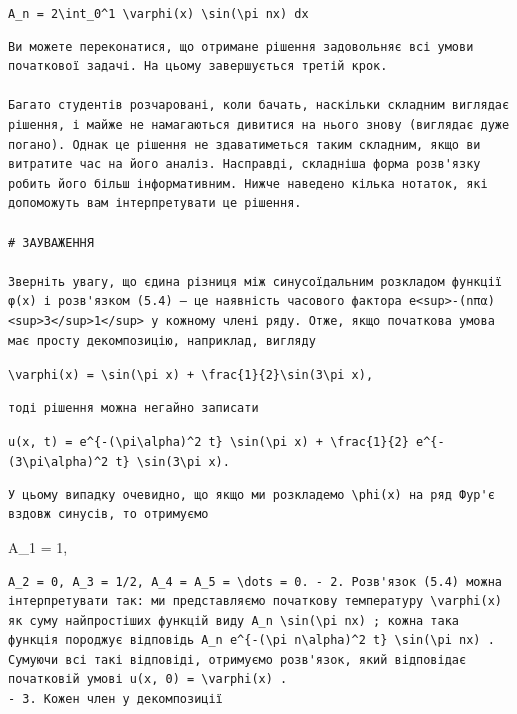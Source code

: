 \documentclass[
  ukrainian,
]{article}
\begin{document}
\texttt{A\_n\ =\ 2\textbackslash{}int\_0\^{}1\ \textbackslash{}varphi(x)\ \textbackslash{}sin(\textbackslash{}pi\ nx)\ dx}

\begin{verbatim}
Ви можете переконатися, що отримане рішення задовольняє всі умови початкової задачі. На цьому завершується третій крок.

Багато студентів розчаровані, коли бачать, наскільки складним виглядає рішення, і майже не намагаються дивитися на нього знову (виглядає дуже погано). Однак це рішення не здаватиметься таким складним, якщо ви витратите час на його аналіз. Насправді, складніша форма розв'язку робить його більш інформативним. Нижче наведено кілька нотаток, які допоможуть вам інтерпретувати це рішення.

# ЗАУВАЖЕННЯ

Зверніть увагу, що єдина різниця між синусоїдальним розкладом функції φ(x) і розв'язком (5.4) — це наявність часового фактора e<sup>-(nπα)<sup>3</sup>1</sup> у кожному члені ряду. Отже, якщо початкова умова має просту декомпозицію, наприклад, вигляду
\end{verbatim}

\texttt{\textbackslash{}varphi(x)\ =\ \textbackslash{}sin(\textbackslash{}pi\ x)\ +\ \textbackslash{}frac\{1\}\{2\}\textbackslash{}sin(3\textbackslash{}pi\ x),}

\begin{verbatim}
тоді рішення можна негайно записати
\end{verbatim}

\texttt{u(x,\ t)\ =\ e\^{}\{-(\textbackslash{}pi\textbackslash{}alpha)\^{}2\ t\}\ \textbackslash{}sin(\textbackslash{}pi\ x)\ +\ \textbackslash{}frac\{1\}\{2\}\ e\^{}\{-(3\textbackslash{}pi\textbackslash{}alpha)\^{}2\ t\}\ \textbackslash{}sin(3\textbackslash{}pi\ x).}

\begin{verbatim}
У цьому випадку очевидно, що якщо ми розкладемо \phi(x) на ряд Фур'є вздовж синусів, то отримуємо
\end{verbatim}

A\_1 = 1,

\begin{verbatim}
A_2 = 0, A_3 = 1/2, A_4 = A_5 = \dots = 0. - 2. Розв'язок (5.4) можна інтерпретувати так: ми представляємо початкову температуру \varphi(x) як суму найпростіших функцій виду A_n \sin(\pi nx) ; кожна така функція породжує відповідь A_n e^{-(\pi n\alpha)^2 t} \sin(\pi nx) . Сумуючи всі такі відповіді, отримуємо розв'язок, який відповідає початковій умові u(x, 0) = \varphi(x) .
- 3. Кожен член у декомпозиції
\end{verbatim}
\end{document}
